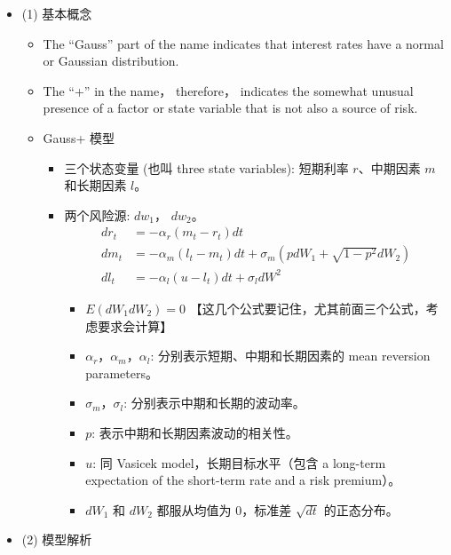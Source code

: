 \begin{itemize}
\item (1) 基本概念

    \begin{itemize}
    \item The ``Gauss'' part of the name indicates that interest rates have a normal or Gaussian distribution.
    \item The ``+'' in the name， therefore， indicates the somewhat unusual presence of a factor or state variable that is not also a source of risk.
    \item Gauss+ 模型
        \begin{itemize}
        \item 三个状态变量 (也叫 three state variables): 短期利率 \( r \)、中期因素 \( m \) 和长期因素 \( l \)。
        \item 两个风险源: \( dw_1 \)， \( dw_2 \)。
            \begin{align*}
            dr_t &= -\alpha_r(m_t - r_t)dt \\
            dm_t &= -\alpha_m(l_t - m_t)dt + \sigma_m(pdW_1 + \sqrt{1 - p^2}dW_2) \\
            dl_t &= -\alpha_l(u - l_t)dt + \sigma_l dW^2
            \end{align*}

            \begin{itemize}
             \item \( E(dW_1 dW_2) = 0 \) 【这几个公式要记住，尤其前面三个公式，考虑要求会计算】
            \item \( \alpha_r， \alpha_m， \alpha_l \): 分别表示短期、中期和长期因素的 mean reversion parameters。
            \item \( \sigma_m， \sigma_l \): 分别表示中期和长期的波动率。
            \item \( p \): 表示中期和长期因素波动的相关性。
            \item \( u \): 同 Vasicek model，长期目标水平（包含 a long-term expectation of the short-term rate and a risk premium）。
            \item \( dW_1 \) 和 \( dW_2 \) 都服从均值为 0，标准差 \( \sqrt{dt} \) 的正态分布。
            \end{itemize}
        \end{itemize}
    \end{itemize}

\item (2) 模型解析
    \begin{itemize}
    

\end{itemize}
\end{itemize}
